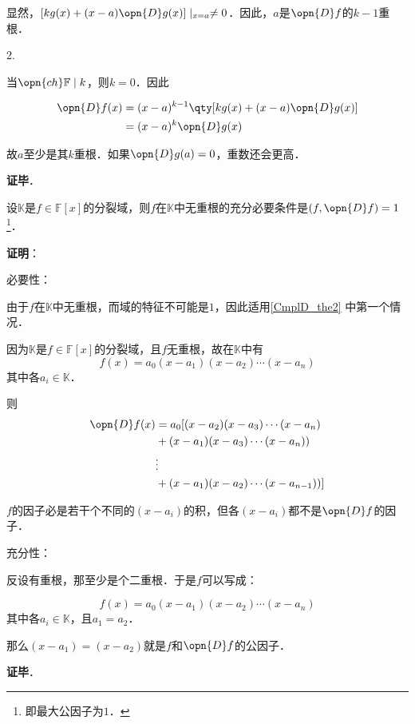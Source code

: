 显然，$[kg(x)+(x-a)\opn{D}g(x)]\mid_{x=a}\neq 0$．因此，$a$是$\opn{D}f$的$k-1$重根．


2. 

当$\opn{ch}\mathbb{F}\mid k$，则$k=0$．因此

\begin{equation}
\begin{aligned}
\opn{D}f(x)&=(x-a)^{k-1}\qty[kg(x)+(x-a)\opn{D}g(x)]\\
&=(x-a)^k\opn{D}g(x)
\end{aligned}
\end{equation}

故$a$至少是其$k$重根．如果$\opn{D}g(a)=0$，重数还会更高．

\textbf{证毕}．



\begin{corollary}{}
设$\mathbb{K}$是$f\in\mathbb{F}[x]$的分裂域，则$f$在$\mathbb{K}$中无重根的充分必要条件是$(f, \opn{D}f)=1$\footnote{即最大公因子为$1$．}．
\end{corollary}

\textbf{证明}：

必要性：

由于$f$在$\mathbb{K}$中无重根，而域的特征不可能是$1$，因此适用\autoref{CmplD_the2} 中第一个情况．

因为$\mathbb{K}$是$f\in\mathbb{F}[x]$的分裂域，且$f$无重根，故在$\mathbb{K}$中有
\begin{equation}
f(x) = a_0(x-a_1)(x-a_2)\cdots(x-a_n)
\end{equation}
其中各$a_i\in\mathbb{K}$．

则
\begin{equation}
\begin{aligned}
\opn{D}f(x) &= a_0[(x-a_2)(x-a_3)\cdots(x-a_n)\\
&+(x-a_1)(x-a_3)\cdots(x-a_n))\\
&\vdots\\
&+(x-a_1)(x-a_2)\cdots(x-a_{n-1}))
]
\end{aligned}
\end{equation}

$f$的因子必是若干个不同的$(x-a_i)$的积，但各$(x-a_i)$都不是$\opn{D}f$的因子．

充分性：

反设有重根，那至少是个二重根．于是$f$可以写成：

\begin{equation}
f(x) = a_0(x-a_1)(x-a_2)\cdots(x-a_n)
\end{equation}
其中各$a_i\in\mathbb{K}$，且$a_1=a_2$．

那么$(x-a_1)=(x-a_2)$就是$f$和$\opn{D}f$的公因子．

\textbf{证毕}．


















